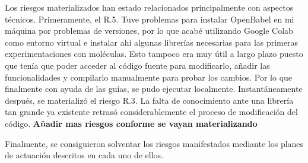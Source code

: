 Los riesgos materializados han estado relacionados principalmente con aspectos técnicos. Primeramente, el R.5. Tuve problemas para instalar OpenBabel en mi máquina por problemas de versiones, por lo que acabé utilizando Google Colab como entorno virtual e instalar ahí algunas librerías necesarias para las primeras experimentaciones con moléculas. Esto tampoco era muy útil a largo plazo puesto que tenía que poder acceder al código fuente para modificarlo, añadir las funcionalidades y compilarlo manualmente para probar los cambios. Por lo que finalmente con ayuda de las guías, se pudo ejecutar localmente. Instantáneamente después, se materializó el riesgo R.3. La falta de conocimiento ante una librería tan grande ya existente retrasó considerablemente el proceso de modificación del código. 
\textbf{Añadir mas riesgos conforme se vayan materializando}

Finalmente, se consiguieron solventar los riesgos manifestados mediante los planes de actuación descritos en cada uno de ellos.
